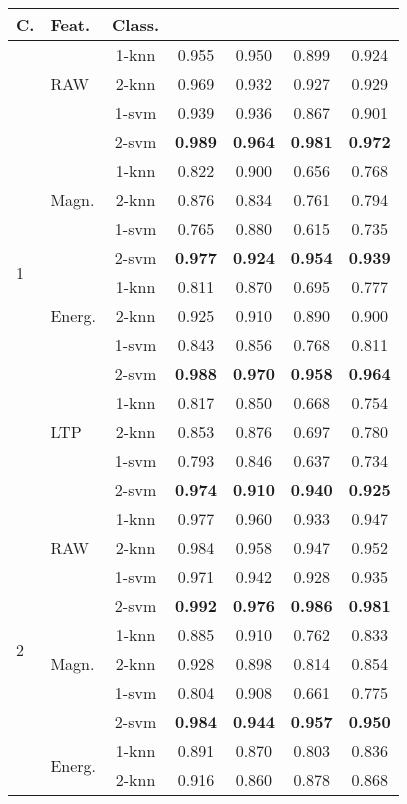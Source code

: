 \documentclass[twocolumn]{svjour3}          \smartqed  \usepackage[draft]{hyperref}
\begin{document}
\begin{table}[tb]
\scriptsize
\centering
\begin{tabular}{llccccc}
C.&	Feat.&Class.	&	 &	 &		&	 \\
\hline \multirow{16}{*}{1}	&\multirow{3}{*}{RAW}	&1-knn&	0.955&	0.950&	0.899&	0.924\\ 
&&2-knn&	0.969&	0.932&	0.927&	0.929\\ 
&&1-svm&	0.939&	0.936&	0.867&	0.901\\ 
&&2-svm&	\bf{0.989}&	\bf{0.964}&	\bf{0.981}&	\bf{0.972}\\ 
[2pt] 
&\multirow{3}{*}{Magn.}	&1-knn&	0.822&	0.900&	0.656&	0.768\\ 
&&2-knn&	0.876&	0.834&	0.761&	0.794\\ 
&&1-svm&	0.765&	0.880&	0.615&	0.735\\ 
&&2-svm&	\bf{0.977}&	\bf{0.924}&	\bf{0.954}&	\bf{0.939}\\ 
[2pt] 
&\multirow{3}{*}{Energ.}	&1-knn&	0.811&	0.870&	0.695&	0.777\\ 
&&2-knn&	0.925&	0.910&	0.890&	0.900\\ 
&&1-svm&	0.843&	0.856&	0.768&	0.811\\ 
&&2-svm&	\bf{0.988}&	\bf{0.970}&	\bf{0.958}&	\bf{0.964}\\ 
[2pt] 
&\multirow{3}{*}{LTP}	&1-knn&	0.817&	0.850&	0.668&	0.754\\ 
&&2-knn&	0.853&	0.876&	0.697&	0.780\\ 
&&1-svm&	0.793&	0.846&	0.637&	0.734\\ 
&&2-svm&	\bf{0.974}&	\bf{0.910}&	\bf{0.940}&	\bf{0.925}\\ 
[2pt] 
\hline 
\multirow{16}{*}{2}	&\multirow{3}{*}{RAW}	&1-knn&	0.977&	0.960&	0.933&	0.947\\ 
&&2-knn&	0.984&	0.958&	0.947&	0.952\\ 
&&1-svm&	0.971&	0.942&	0.928&	0.935\\ 
&&2-svm&	\bf{0.992}&	\bf{0.976}&	\bf{0.986}&	\bf{0.981}\\ 
[2pt] 
&\multirow{3}{*}{Magn.}	&1-knn&	0.885&	0.910&	0.762&	0.833\\ 
&&2-knn&	0.928&	0.898&	0.814&	0.854\\ 
&&1-svm&	0.804&	0.908&	0.661&	0.775\\ 
&&2-svm&	\bf{0.984}&	\bf{0.944}&	\bf{0.957}&	\bf{0.950}\\ 
[2pt] 
&\multirow{3}{*}{Energ.}	&1-knn&	0.891&	0.870&	0.803&	0.836\\ 
&&2-knn&	0.916&	0.860&	0.878&	0.868\\ 

\end{tabular}
\end{table}
\end{document}
